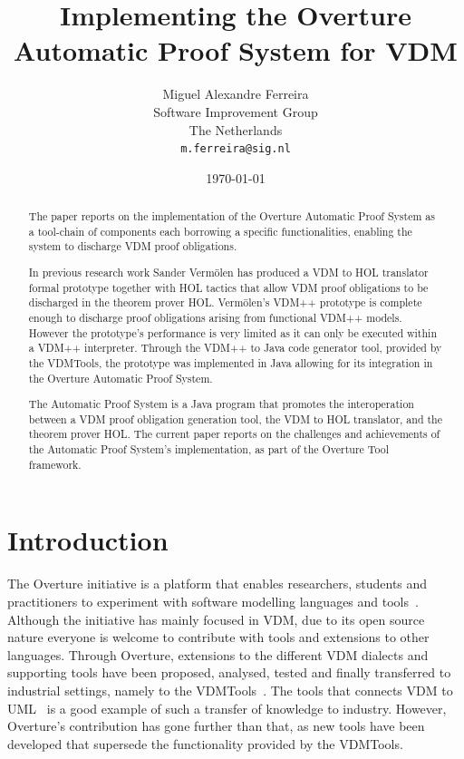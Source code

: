 \documentclass[]{article}
\title{Implementing the Overture Automatic Proof System for VDM}
\author{Miguel Alexandre Ferreira\\
        Software Improvement Group\\
		The Netherlands\\ 
		\texttt{m.ferreira@sig.nl}}
\date{\today}
\begin{document}
\maketitle
\begin{abstract}
The paper reports on the implementation of the Overture Automatic Proof System as a tool-chain of components each borrowing a specific functionalities, enabling the system to discharge VDM proof obligations.

In previous research work Sander Verm\"olen has produced a VDM to HOL translator formal prototype together with HOL tactics that allow VDM proof obligations to be discharged in the theorem prover HOL.
Verm\"olen's VDM++ prototype is complete enough to discharge proof obligations arising from functional VDM++ models.
However the prototype's performance is very limited as it can only be executed within a VDM++ interpreter.
Through the VDM++ to Java code generator tool, provided by the VDMTools, the prototype was implemented in Java allowing for its integration in the Overture Automatic Proof System.

The Automatic Proof System is a Java program that promotes the interoperation between a VDM proof obligation generation tool, the VDM to HOL translator, and the theorem prover HOL.
The current paper reports on the challenges and achievements of the Automatic Proof System's implementation, as part of the Overture Tool framework.
\end{abstract}

\section{Introduction}
\label{sec:introduction}

The Overture initiative is a platform that enables researchers, students and practitioners to experiment with software modelling languages and tools~\cite{LarsenBFL08}.
Although the initiative has mainly focused in VDM, due to its open source nature everyone is welcome to contribute with tools and extensions to other languages.
Through Overture, extensions to the different VDM dialects and supporting tools have been proposed, analysed, tested and finally transferred to industrial settings, namely to the VDMTools~\cite{DBLP:journals/sigplan/FitzgeraldLS08}.
The tools that connects VDM to UML~\cite{Lausdahl08,Lausdahl09} is a good example of such a transfer of knowledge to industry.
However, Overture's contribution has gone further than that, as new tools have been developed that supersede the functionality provided by the VDMTools.
\end{document}
